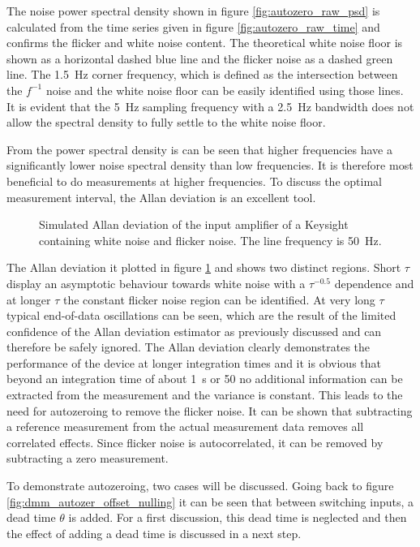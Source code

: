 The noise power spectral density shown in figure \ref{fig:autozero_raw_psd} is calculated from the time series given in figure \ref{fig:autozero_raw_time} and confirms the flicker and white noise content. The theoretical white noise floor is shown as a horizontal dashed blue line and the flicker noise as a dashed green line. The \qty{1.5}{\Hz} corner frequency, which is defined as the intersection between the $f^{-1}$ noise and the white noise floor can be easily identified using those lines. It is evident that the \qty{5}{\Hz} sampling frequency with a \qty{2.5}{\Hz} bandwidth does not allow the spectral density to fully settle to the white noise floor.

From the power spectral density is can be seen that higher frequencies have a significantly lower noise spectral density than low frequencies. It is therefore most beneficial to do measurements at higher frequencies. To discuss the optimal measurement interval, the Allan deviation is an excellent tool.
\begin{figure}[ht]
    \centering
    \caption{Simulated Allan deviation of the input amplifier of a Keysight  containing white noise and flicker noise. The line frequency is \qty{50}{\Hz}.}
    \label{fig:autozero_raw_adev}
\end{figure}

The Allan deviation it plotted in figure \ref{fig:autozero_raw_adev} and shows two distinct regions. Short $\tau$ display an asymptotic behaviour towards white noise with a $\tau^{−0.5}$ dependence and at longer $\tau$ the constant flicker noise region can be identified. At very long $\tau$ typical end-of-data oscillations can be seen, which are the result of the limited confidence of the Allan deviation estimator as previously discussed and can therefore be safely ignored. The Allan deviation clearly demonstrates the performance of the device at longer integration times and it is obvious that beyond an integration time of about \qty{1}{\second} or \qty{50}{\plc} no additional information can be extracted from the measurement and the variance is constant. This leads to the need for autozeroing to remove the flicker noise. It can be shown \cite{autozero_with_dead_time} that subtracting a reference measurement from the actual measurement data removes all correlated effects. Since flicker noise is autocorrelated, it can be removed by subtracting a zero measurement.

To demonstrate autozeroing, two cases will be discussed. Going back to figure \ref{fig:dmm_autozer_offset_nulling} it can be seen that between switching inputs, a dead time $\theta$ is added. For a first discussion, this dead time is neglected and then the effect of adding a dead time is discussed in a next step.


